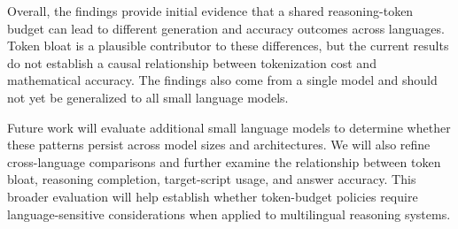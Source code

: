 \documentclass[11pt]{article}
\begin{document}
Overall, the findings provide initial evidence that a shared reasoning-token budget can lead to different generation and accuracy outcomes across languages. Token bloat is a plausible contributor to these differences, but the current results do not establish a causal relationship between tokenization cost and mathematical accuracy. The findings also come from a single model and should not yet be generalized to all small language models.

Future work will evaluate additional small language models to determine whether these patterns persist across model sizes and architectures. We will also refine cross-language comparisons and further examine the relationship between token bloat, reasoning completion, target-script usage, and answer accuracy. This broader evaluation will help establish whether token-budget policies require language-sensitive considerations when applied to multilingual reasoning systems.

% 

\end{document}
